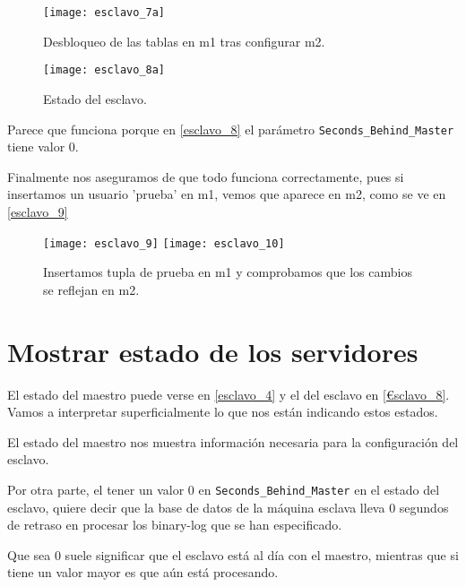 \begin{figure}[h!]
\begin{center}
\caption{Desbloqueo de las tablas en m1 tras configurar m2.}
\label{esclavo_6}
\texttt{[image: esclavo\_7a]}
\end{center}
\end{figure}

\begin{figure}[h!]
\begin{center}
\caption{Estado del esclavo.}
\label{esclavo_8}
\texttt{[image: esclavo\_8a]}
\end{center}
\end{figure}

Parece que funciona porque en \eqref{esclavo_8} el parámetro \verb|Seconds_Behind_Master| tiene valor 0.

Finalmente nos aseguramos de que todo funciona correctamente, pues si insertamos un usuario 'prueba' en m1, vemos que aparece en m2, como se ve en \eqref{esclavo_9}

\begin{figure}[h!]
\begin{center}
\caption{Insertamos tupla de prueba en m1 y comprobamos que los cambios se reflejan en m2.}
\label{esclavo_9}
\texttt{[image: esclavo\_9]}
\texttt{[image: esclavo\_10]}
\end{center}
\end{figure}



\chapter{Mostrar estado de los servidores}

El estado del maestro puede verse en \eqref{esclavo_4} y el del esclavo en \eqref{€sclavo_8}. Vamos a interpretar superficialmente lo que nos están indicando estos estados.

El estado del maestro nos muestra información necesaria para la configuración del esclavo.

Por otra parte, el tener un valor $0$ en \verb|Seconds_Behind_Master| en el estado del esclavo, quiere decir que la base de datos de la máquina esclava lleva 0 segundos de retraso en procesar los binary-log que se han especificado.

Que sea 0 suele significar que el esclavo está al día con el maestro, mientras que si tiene un valor mayor es que aún está procesando.

